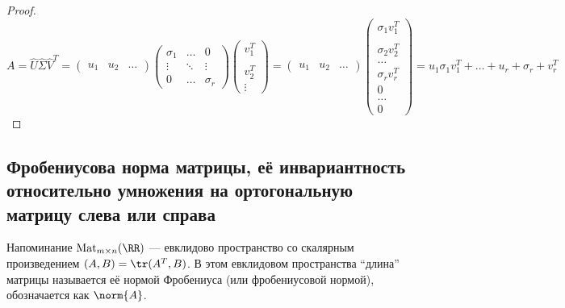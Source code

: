 \begin{proof}
    \begin{equation*}
        A = \widehat{U} \widehat{\Sigma} \widehat{V}^T = \begin{pmatrix} u_1 & u_2 & \dots \end{pmatrix} 
        \begin{pmatrix} 
            \sigma_1 & \dots & 0 \\
            \vdots & \ddots & \vdots \\
            0 & \dots & \sigma_r
        \end{pmatrix}
        \begin{pmatrix} v_1^T \\ \\ v_2^T\\ \vdots \end{pmatrix} = \begin{pmatrix} u_1 & u_2 & \dots \end{pmatrix} 
        \begin{pmatrix} \sigma_1 v_1^T \\ \\ \sigma_2 v_2^T \\ \dots \\ \sigma_r v_r^T \\ 0 \\ \dots \\ 0 \end{pmatrix}
        = u_1 \sigma_1 v_1^T + \dots + u_r + \sigma_r + v_r^T
    \end{equation*}
\end{proof} 

\subsection{Фробениусова норма матрицы, её инвариантность относительно умножения на ортогональную матрицу слева или справа}

Напоминание $\text{Mat}_{m \times n} (\RR)$ --- евклидово пространство со скалярным произведением $(A, B) = \tr (A^T, B)$. В этом евклидовом пространства ``длина'' матрицы называется её нормой Фробениуса (или фробениусовой нормой), обозначается как $\norm{A}$.

